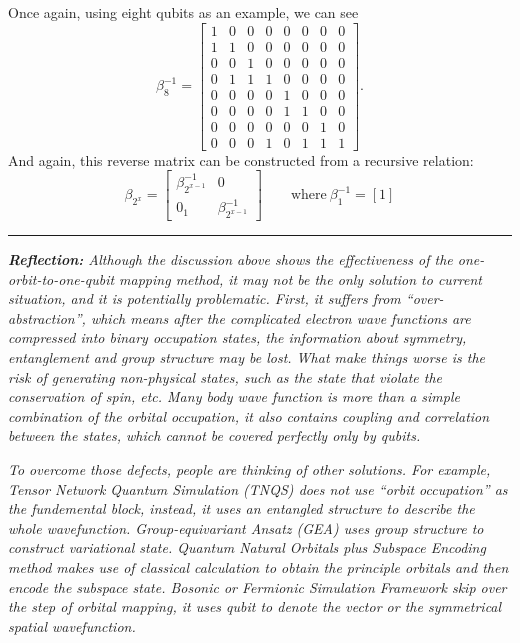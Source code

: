 Once again, using eight qubits as an example, we can see 
\begin{equation}
    \beta^{-1}_8=
    \begin{bmatrix}
        1&0&0&0&0&0&0&0\\
        1&1&0&0&0&0&0&0\\
        0&0&1&0&0&0&0&0\\
        0&1&1&1&0&0&0&0\\
        0&0&0&0&1&0&0&0\\
        0&0&0&0&1&1&0&0\\
        0&0&0&0&0&0&1&0\\
        0&0&0&1&0&1&1&1
    \end{bmatrix}.
\end{equation}
And again, this reverse matrix can be constructed from a recursive relation:
\begin{equation}
    \beta_{2^x}=
    \left[\begin{array}{c|c}
        \beta_{2^{x-1}}^{-1} & 0 \\
        \hline
        0_1 & \beta_{2^{x-1}}^{-1}
    \end{array}\right] 
    \qquad \text{where} \: \beta_1^{-1}=\left[1\right]
\end{equation}
\vspace{0.5em}
\hrule
\vspace{0.5em}
\textit{\textbf{Reflection:} Although the discussion above shows the effectiveness of the one-orbit-to-one-qubit mapping method, it may not be the only solution to current situation, and it is potentially problematic. First, it suffers from ``over-abstraction'', which means after the complicated electron wave functions are compressed into binary occupation states, the information about symmetry, entanglement and group structure may be lost. What make things worse is the risk of generating non-physical states, such as the state that violate the conservation of spin, etc. Many body wave function is more than a simple combination of the orbital occupation, it also contains coupling and correlation between the states, which cannot be covered perfectly only by qubits.}

\textit{To overcome those defects, people are thinking of other solutions. For example, Tensor Network Quantum Simulation (TNQS) \cite{TensorNetwork}  does not use ``orbit occupation'' as the fundemental block, instead, it uses an entangled structure to describe the whole wavefunction. Group-equivariant Ansatz (GEA) uses group structure to construct variational state. Quantum Natural Orbitals plus Subspace Encoding method makes use of classical calculation to obtain the principle orbitals and then encode the subspace state. Bosonic or Fermionic Simulation Framework skip over the step of orbital mapping, it uses qubit to denote the vector or the symmetrical spatial wavefunction.}



